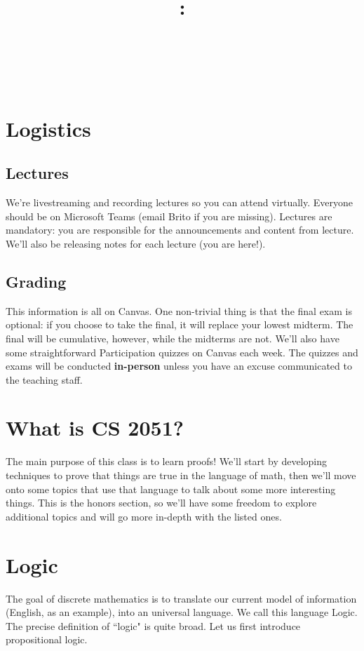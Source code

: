 \documentclass{article}
\title{
    \vspace{2in}
    \textbf{\lectClass:\\ \lectTitle}\\
    \vspace{0.1in}\large{\textit{\lectClassInstructor\ \lectSection}}
    \vspace{3in}
    \author{\textbf{\lectAuthorName}}
    \date{}
}
\begin{document}
\maketitle
\pagebreak

\section*{Logistics}

\subsection*{Lectures}
    We're livestreaming and recording lectures so you can attend virtually. Everyone should be on Microsoft Teams (email Brito if you are missing). Lectures are mandatory: you are responsible for the announcements and content from lecture. We'll also be releasing notes for each lecture (you are here!).

\subsection*{Grading}
    This information is all on Canvas. One non-trivial thing is that the final exam is optional: if you choose to take the final, it will replace your lowest midterm. The final will be cumulative, however, while the midterms are not. We'll also have some straightforward Participation quizzes on Canvas each week. The quizzes and exams will be conducted \textbf{in-person} unless you have an excuse communicated to the teaching staff.

\section*{What is CS 2051?}
    The main purpose of this class is to learn proofs! 
    We'll start by developing techniques to prove that things are true in the language of math, then we'll move onto some topics that use that language to talk about some more interesting things. This is the honors section, so we'll have some freedom to explore additional topics and will go more in-depth with the listed ones.
    

\section*{Logic}
    The goal of discrete mathematics is to translate our current model of information (English, as an example), into an universal language. We call this language Logic. The precise definition of ``logic" is quite broad. Let us first introduce propositional logic.
\end{document}

